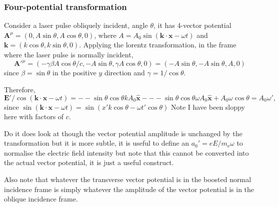 \subsubsection{Four-potential transformation}
Consider a laser pulse obliquely incident, angle $\theta$, it has 4-vector potential $\mathbf{A}^\mu = (0, A\sin\theta,A\cos\theta,0)$, where $A = A_0\sin(\mathbf{k}\cdot\mathbf{x} - \omega t)$ and $\mathbf{k} = (k\cos\theta,k\sin\theta,0)$. Applying the lorentz transformation, in the frame where the laser pulse is normally incident,
\begin{equation}
	\mathbf{A}'^\mu = (-\gamma\beta A\cos\theta/c,  - A\sin\theta, \gamma A\cos\theta,0) = (-A\sin\theta, -A\sin\theta, A,0) 
\end{equation}
since $\beta = \sin\theta$ in the positive $y$ direction and $\gamma = 1/\cos\theta$.

Therefore,
\begin{equation}
	\mathbf{E}'/\cos(\mathbf{k}\cdot\mathbf{x} - \omega t) = --\sin\theta\cos\theta k A_0\hat{\mathbf{x}} --- \sin\theta\cos\theta \omega A_0\hat{\mathbf{x}} + A_0\omega\cos\theta = A_0\omega',
\end{equation}
since $\sin(\mathbf{k}\cdot\mathbf{x} - \omega t) = \sin(x'k\cos\theta-\omega t'\cos\theta)$
Note I have been sloppy here with factors of $c$.

Do it does look at though the vector potential amplitude is unchanged by the transformation but it is more subtle, it is useful to define an $a_0' = eE/m_\mathrm{e}\omega$ to normalise the electric field intensity but note that this cannot be converted into the actual vector potential, it is just a useful construct.

Also note that whatever the transverse vector potential is in the boosted normal incidence frame is simply whatever the amplitude of the vector potential is in the oblique incidence frame.

